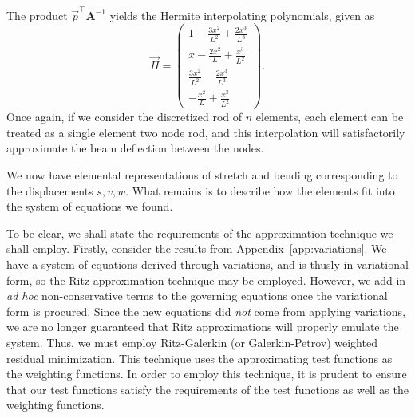 The product $\vec{p}^\top\mathbf{A}^{-1}$ yields the Hermite interpolating polynomials, given as
\begin{equation}
\vec{H} = 
\begin{pmatrix}
1 - \frac{3x^2}{L^2} + \frac{2x^3}{L^3} \\
x - \frac{2x^2}{L} + \frac{x^3}{L^2} \\
\frac{3x^2}{L^2} - \frac{2x^3}{L^3} \\
-\frac{x^2}{L} + \frac{x^3}{L^2}
\end{pmatrix}.
\label{eq:bending.hermitian.vector}
\end{equation}
Once again, if we consider the discretized rod of $n$ elements, each element can be treated as a single element two node rod, and this interpolation will satisfactorily approximate the beam deflection between the nodes. 

We now have elemental representations of stretch and bending corresponding to the displacements $s,v,w$. What remains is to describe how the elements fit into the system of equations we found.

To be clear, we shall state the requirements of the approximation technique we shall employ. Firstly, consider the results from Appendix~\ref{app:variations}. We have a system of equations derived through variations, and is thusly in variational form, so the Ritz approximation technique may be employed. However, we add in \emph{ad hoc} non-conservative terms to the governing equations once the variational form is procured. Since the new equations did \emph{not} come from applying variations, we are no longer guaranteed that Ritz approximations will properly emulate the system. Thus, we must employ Ritz-Galerkin (or Galerkin-Petrov) weighted residual minimization. This technique uses the approximating test functions as the weighting functions. In order to employ this technique, it is prudent to ensure that our test functions satisfy the requirements of the test functions as well as the weighting functions.

